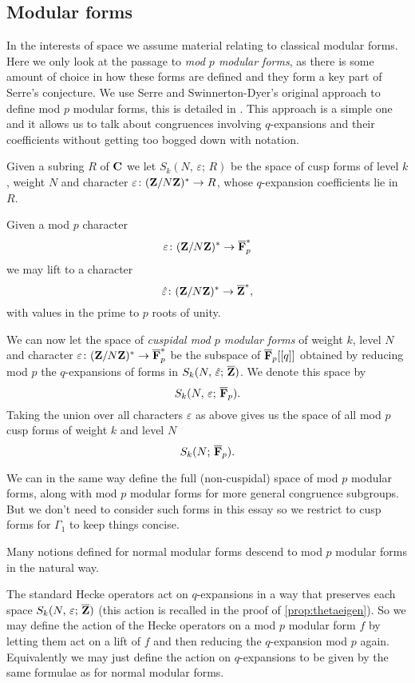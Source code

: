 \documentclass[a4paper,12pt]{article}
\begin{document}
\subsection{Modular forms}
In the interests of space we assume material relating to classical modular forms.
Here we only look at the passage to \emph{mod $p$ modular forms}, as there is some amount of choice in how these forms are defined and they form a key part of Serre's conjecture.
We use Serre and Swinnerton-Dyer's original approach to define mod $p$ modular forms, this is detailed in \cite{SD,Serre73,Serre73Formes}.
This approach is a simple one and it allows us to talk about congruences involving $q$-expansions and their coefficients without getting too bogged down with notation.

\begin{defn}%
Given a subring $R$ of $\mathbf{C}$ we let $S_k(N,\,\varepsilon;\,R)$ be the space of cusp forms of level $k$, weight $N$ and character $\varepsilon\colon (\mathbf{Z}/N\mathbf{Z})^* \to R$, whose $q$-expansion coefficients lie in $R$.

Given a mod $p$ character
\[
\varepsilon\colon (\mathbf{Z}/N\mathbf{Z})^* \to \overline{\mathbf{F}}_p^*
\]
we may lift to a character %
\[
\hat{\varepsilon}\colon (\mathbf{Z}/N\mathbf{Z})^* \to \overline{\mathbf{Z}}^*,
\]
with values in the prime to $p$ roots of unity.

We can now let the space of \emph{cuspidal mod $p$ modular forms} of weight $k$, level $N$ and character $\varepsilon\colon (\mathbf{Z}/N\mathbf{Z})^* \to \overline{\mathbf{F}}_p^*$ be the subspace of $\overline{\mathbf{F}}_p[[q]]$ obtained by reducing mod $p$ the $q$-expansions of forms in $S_k(N,\,\hat{\varepsilon};\,\overline{\mathbf{Z}})$.
We denote this space by
\[
S_k(N,\,\varepsilon;\,\overline{\mathbf{F}}_p).
\]
Taking the union over all characters $\varepsilon$ as above gives us the space of all mod $p$ cusp forms of weight $k$ and level $N$
\[
S_k(N;\,\overline{\mathbf{F}}_p).
\]

We can in the same way define the full (non-cuspidal) space of mod $p$ modular forms, along with mod $p$ modular forms for more general congruence subgroups.
But we don't need to consider such forms in this essay so we restrict to cusp forms for $\Gamma_1$ to keep things concise.
\end{defn}

Many notions defined for normal modular forms descend to mod $p$ modular forms in the natural way.

\begin{defn}
The standard Hecke operators act on $q$-expansions in a way that preserves each space $S_k(N,\,\varepsilon;\,\overline{\mathbf{Z}})$ (this action is recalled in the proof of \cref{prop:thetaeigen}).
So we may define the action of the Hecke operators on a mod $p$ modular form $f$ by letting them act on a lift of $f$ and then reducing the $q$-expansion mod $p$ again.
Equivalently we may just define the action on $q$-expansions to be given by the same formulae as for normal modular forms.
\end{defn}
\end{document}
